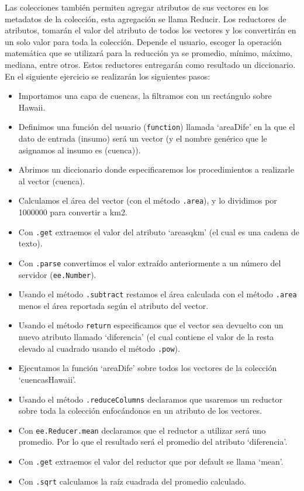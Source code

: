 \documentclass[
  12pt,
  letterpaper,
  twoside]{book}
\providecommand{\tightlist}{%
  \setlength{\itemsep}{0pt}\setlength{\parskip}{0pt}}
\begin{document}
Las colecciones también permiten agregar atributos de sus vectores en los metadatos de la colección, esta agregación se llama Reducir. Los reductores de atributos, tomarán el valor del atributo de todos los vectores y los convertirán en un solo valor para toda la colección. Depende el usuario, escoger la operación matemática que se utilizará para la reducción ya se promedio, mínimo, máximo, mediana, entre otros. Estos reductores entregarán como resultado un diccionario. En el siguiente ejercicio se realizarán los siguientes pasos:

\begin{itemize}
\tightlist
\item
  Importamos una capa de cuencas, la filtramos con un rectángulo sobre Hawaii.
\item
  Definimos una función del usuario (\texttt{function}) llamada `areaDife' en la que el dato de entrada (insumo) será un vector (y el nombre genérico que le asignamos al insumo es (cuenca)).
\item
  Abrimos un diccionario donde especificaremos los procedimientos a realizarle al vector (cuenca).
\item
  Calculamos el área del vector (con el método \texttt{.area}), y lo dividimos por 1000000 para convertir a km2.
\item
  Con \texttt{.get} extraemos el valor del atributo `areasqkm' (el cual es una cadena de texto).
\item
  Con \texttt{.parse} convertimos el valor extraído anteriormente a un número del servidor (\texttt{ee.Number}).
\item
  Usando el método \texttt{.subtract} restamos el área calculada con el método \texttt{.area} menos el área reportada según el atributo del vector.
\item
  Usando el método \texttt{return} especificamos que el vector sea devuelto con un nuevo atributo llamado `diferencia' (el cual contiene el valor de la resta elevado al cuadrado usando el método \texttt{.pow}).
\item
  Ejecutamos la función `areaDife' sobre todos los vectores de la colección `cuencasHawaii'.
\item
  Usando el método \texttt{.reduceColumns} declaramos que usaremos un reductor sobre toda la colección enfocándonos en un atributo de los vectores.
\item
  Con \texttt{ee.Reducer.mean} declaramos que el reductor a utilizar será uno promedio. Por lo que el resultado será el promedio del atributo `diferencia'.
\item
  Con \texttt{.get} extraemos el valor del reductor que por default se llama `mean'.
\item
  Con \texttt{.sqrt} calculamos la raíz cuadrada del promedio calculado.
\end{itemize}
\end{document}
